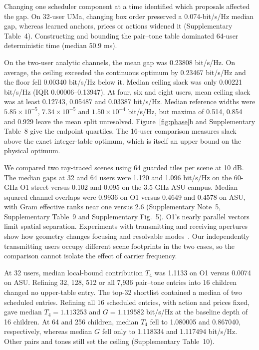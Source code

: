 \documentclass[lineno,pdflatex,sn-nature]{sn-jnl}
\begin{document}
Changing one scheduler component at a time identified which proposals affected the gap. On 32-user UMa, changing box order preserved a 0.074-bit/s/Hz median gap, whereas learned anchors, prices or actions widened it (Supplementary Table~4). Constructing and bounding the pair--tone table dominated 64-user deterministic time (median 50.9 ms).

On the two-user analytic channels, the mean gap was 0.23808 bit/s/Hz. On average, the ceiling exceeded the continuous optimum by 0.23467 bit/s/Hz and the floor fell 0.00340 bit/s/Hz below it. Median ceiling slack was only 0.00221 bit/s/Hz (IQR 0.00006--0.13947). At four, six and eight users, mean ceiling slack was at least 0.12743, 0.05487 and 0.03387 bit/s/Hz. Median reference widths were \(5.85\times10^{-5}\), \(7.34\times10^{-5}\) and \(1.50\times10^{-4}\) bit/s/Hz, but maxima of 0.514, 0.854 and 0.929 leave the mean split unresolved. Figure~\ref{fig:phase}b and Supplementary Table~8 give the endpoint quartiles. The 16-user comparison measures slack above the exact integer-table optimum, which is itself an upper bound on the physical optimum.


We compared two ray-traced scenes using 64 guarded tiles per scene at 10 dB. The median gaps at 32 and 64 users were 1.120 and 1.096 bit/s/Hz on the 60-GHz O1 street versus 0.102 and 0.095 on the 3.5-GHz ASU campus. Median squared channel overlaps were 0.9936 on O1 versus 0.4649 and 0.4578 on ASU, with Gram effective ranks near one versus 2.6 (Supplementary Note~5, Supplementary Table~9 and Supplementary Fig.~5). O1's nearly parallel vectors limit spatial separation. Experiments with transmitting and receiving apertures show how geometry changes focusing and resolvable modes~\cite{kludze2026,shenoam2026}. Our independently transmitting users occupy different scene footprints in the two cases, so the comparison cannot isolate the effect of carrier frequency.

At 32 users, median local-bound contribution \(T_4\) was 1.1133 on O1 versus 0.0074 on ASU. Refining 32, 128, 512 or all 7,936 pair--tone entries into 16 children changed no upper-table entry. The top-32 shortlist contained a median of two scheduled entries. Refining all 16 scheduled entries, with action and prices fixed, gave median \(T_4=1.113253\) and \(G=1.119582\) bit/s/Hz at the baseline depth of 16 children. At 64 and 256 children, median \(T_4\) fell to 1.080005 and 0.867040, respectively, whereas median \(G\) fell only to 1.118334 and 1.117494 bit/s/Hz. Other pairs and tones still set the ceiling (Supplementary Table~10).
\end{document}

